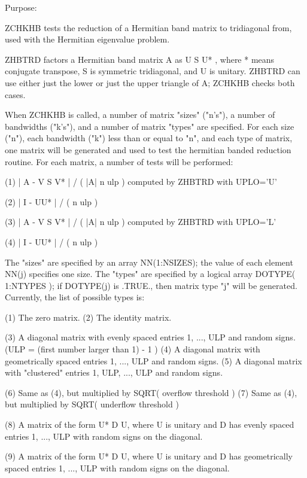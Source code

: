 \begin{DoxyParagraph}{Purpose\+: }
\begin{DoxyVerb} ZCHKHB tests the reduction of a Hermitian band matrix to tridiagonal
 from, used with the Hermitian eigenvalue problem.

 ZHBTRD factors a Hermitian band matrix A as  U S U* , where * means
 conjugate transpose, S is symmetric tridiagonal, and U is unitary.
 ZHBTRD can use either just the lower or just the upper triangle
 of A; ZCHKHB checks both cases.

 When ZCHKHB is called, a number of matrix "sizes" ("n's"), a number
 of bandwidths ("k's"), and a number of matrix "types" are
 specified.  For each size ("n"), each bandwidth ("k") less than or
 equal to "n", and each type of matrix, one matrix will be generated
 and used to test the hermitian banded reduction routine.  For each
 matrix, a number of tests will be performed:

 (1)     | A - V S V* | / ( |A| n ulp )  computed by ZHBTRD with
                                         UPLO='U'

 (2)     | I - UU* | / ( n ulp )

 (3)     | A - V S V* | / ( |A| n ulp )  computed by ZHBTRD with
                                         UPLO='L'

 (4)     | I - UU* | / ( n ulp )

 The "sizes" are specified by an array NN(1:NSIZES); the value of
 each element NN(j) specifies one size.
 The "types" are specified by a logical array DOTYPE( 1:NTYPES );
 if DOTYPE(j) is .TRUE., then matrix type "j" will be generated.
 Currently, the list of possible types is:

 (1)  The zero matrix.
 (2)  The identity matrix.

 (3)  A diagonal matrix with evenly spaced entries
      1, ..., ULP  and random signs.
      (ULP = (first number larger than 1) - 1 )
 (4)  A diagonal matrix with geometrically spaced entries
      1, ..., ULP  and random signs.
 (5)  A diagonal matrix with "clustered" entries 1, ULP, ..., ULP
      and random signs.

 (6)  Same as (4), but multiplied by SQRT( overflow threshold )
 (7)  Same as (4), but multiplied by SQRT( underflow threshold )

 (8)  A matrix of the form  U* D U, where U is unitary and
      D has evenly spaced entries 1, ..., ULP with random signs
      on the diagonal.

 (9)  A matrix of the form  U* D U, where U is unitary and
      D has geometrically spaced entries 1, ..., ULP with random
      signs on the diagonal.


\end{DoxyVerb}
\end{DoxyParagraph}
